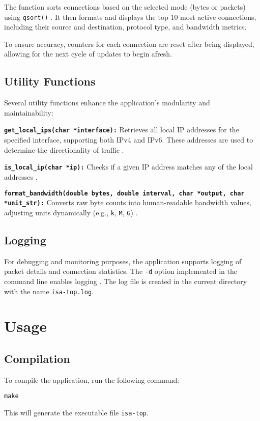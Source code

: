 \documentclass[12pt]{extarticle}
\begin{document}
The function sorts connections based on the selected mode (bytes or packets) using \texttt{qsort()} \cite{linuxman}. It then formats and displays the top 10 most active connections, including their source and destination, protocol type, and bandwidth metrics.

To ensure accuracy, counters for each connection are reset after being displayed, allowing for the next cycle of updates to begin afresh.

\subsection{Utility Functions}

Several utility functions enhance the application's modularity and maintainability:

\textbf{\texttt{get\_local\_ips(char *interface):}} Retrieves all local IP addresses for the specified interface, supporting both IPv4 and IPv6. These addresses are used to determine the directionality of traffic \cite{linuxman}.

\textbf{\texttt{is\_local\_ip(char *ip):}} Checks if a given IP address matches any of the local addresses \cite{beej}.

\textbf{\texttt{format\_bandwidth(double bytes, double interval, char *output, char *unit\_str):}} Converts raw byte counts into human-readable bandwidth values, adjusting units dynamically (e.g., \texttt{k}, \texttt{M}, \texttt{G}) \cite{linuxman}.

\subsection{Logging}

For debugging and monitoring purposes, the application supports logging of packet details and connection statistics. The \texttt{-d} option implemented in the command line enables logging \cite{libpcap}. The log file is created in the current directory with the name \texttt{isa-top.log}.

\section{Usage}

\subsection{Compilation}
To compile the application, run the following command:
\begin{verbatim}
make
\end{verbatim}
This will generate the executable file \texttt{isa-top}.
\end{document}
